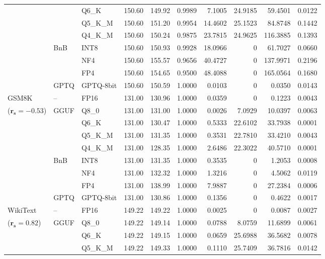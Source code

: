 \begin{longtable}{ll l rrrrrrr}
 &  & Q6\_K & 150.60 & 149.92 & 0.9989 & 7.1005 & 24.9185 & 59.4501 & 0.0122 \\
 &  & Q5\_K\_M & 150.60 & 151.20 & 0.9954 & 14.4602 & 25.1523 & 84.8748 & 0.1442 \\
 &  & Q4\_K\_M & 150.60 & 150.24 & 0.9875 & 23.7815 & 24.9625 & 116.3885 & 0.1393 \\
 & BnB & INT8 & 150.60 & 150.93 & 0.9928 & 18.0966 & \cellcolor{cyan!12} $0$ & 61.7027 & 0.0660 \\
 &  & NF4 & 150.60 & 155.57 & 0.9656 & 40.4727 & \cellcolor{cyan!12} $0$ & 137.9971 & 0.2196 \\
 &  & FP4 & 150.60 & 154.65 & 0.9500 & 48.4088 & \cellcolor{cyan!12} $0$ & 165.0564 & 0.1680 \\
 & GPTQ & GPTQ-8bit & 150.60 & 150.59 & 1.0000 & 0.0103 & \cellcolor{cyan!12} $0$ & 0.0350 & 0.0143 \\
\midrule
GSM8K & -- & FP16 & 131.00 & 130.96 & 1.0000 & 0.0359 & \cellcolor{cyan!12} $0$ & 0.1223 & 0.0043 \\
{\small ($\mathbf{r_s{=}-0.53}$)} & GGUF & Q8\_0 & 131.00 & 131.00 & 1.0000 & 0.0026 & 7.0929 & 10.0397 & 0.0063 \\
 &  & Q6\_K & 131.00 & 130.47 & 1.0000 & 0.5333 & 22.6102 & 33.7938 & 0.0001 \\
 &  & Q5\_K\_M & 131.00 & 131.35 & 1.0000 & 0.3531 & 22.7810 & 33.4210 & 0.0043 \\
 &  & Q4\_K\_M & 131.00 & 128.35 & 1.0000 & 2.6486 & 22.3022 & 40.5710 & 0.0001 \\
 & BnB & INT8 & 131.00 & 131.35 & 1.0000 & 0.3535 & \cellcolor{cyan!12} $0$ & 1.2053 & 0.0008 \\
 &  & NF4 & 131.00 & 132.32 & 1.0000 & 1.3216 & \cellcolor{cyan!12} $0$ & 4.5062 & 0.0119 \\
 &  & FP4 & 131.00 & 138.99 & 1.0000 & 7.9887 & \cellcolor{cyan!12} $0$ & 27.2384 & 0.0006 \\
 & GPTQ & GPTQ-8bit & 131.00 & 130.86 & 1.0000 & 0.1356 & \cellcolor{cyan!12} $0$ & 0.4622 & 0.0017 \\
\midrule
WikiText & -- & FP16 & 149.22 & 149.22 & 1.0000 & 0.0025 & \cellcolor{cyan!12} $0$ & 0.0087 & 0.0027 \\
{\small ($\mathbf{r_s{=}0.82}$)} & GGUF & Q8\_0 & 149.22 & 149.14 & 1.0000 & 0.0788 & 8.0759 & 11.6899 & 0.0061 \\
 &  & Q6\_K & 149.22 & 149.15 & 1.0000 & 0.0659 & 25.6988 & 36.5682 & 0.0078 \\
 &  & Q5\_K\_M & 149.22 & 149.33 & 1.0000 & 0.1110 & 25.7409 & 36.7816 & 0.0142 \\

\end{longtable}
